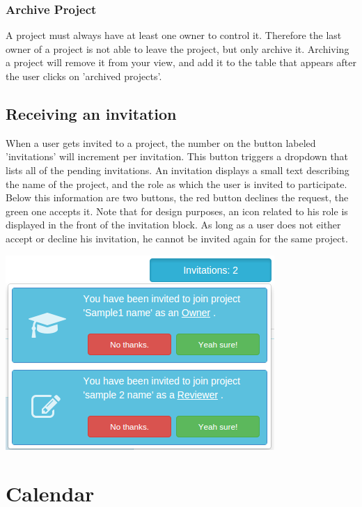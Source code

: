 \subsubsection{Archive Project}

A project must always have at least one owner to control it. Therefore the last owner of a project is not able to leave the project, but only
archive it. Archiving a project will remove it from your view, and add it to the table that appears after the user clicks on 'archived projects'.

\subsection{Receiving an invitation}

When a user gets invited to a project, the number on the button labeled 'invitations' will increment per invitation. This button triggers a dropdown
that lists all of the pending invitations. An invitation displays a small text describing the name of the project, and the role as which
the user is invited to participate. Below this information are two buttons, the red button declines the request, the green one accepts it.
Note that for design purposes, an icon related to his role is displayed in the front of the invitation block. 
As long as a user does not either accept or decline his invitation, he cannot be invited again for the same project.

\begin{center}
\includegraphics[scale=0.5]{./img/invitation.png}
\end{center}

\section{Calendar}

